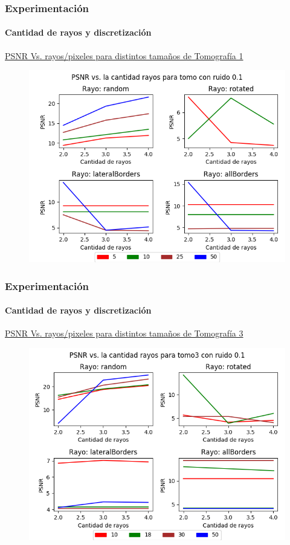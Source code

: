 \documentclass{beamer}
\begin{document}
\begin{frame}
\frametitle{Experimentación}
\framesubtitle{Cantidad de rayos y discretización}
\underline{PSNR Vs. rayos/pixeles para distintos tamaños de Tomografía 1}
\begin{figure}[H]
  \centering
  \includegraphics[height=0.75\textheight]{../graficos/ray_params/tomo/noise_graph_0.png}
\end{figure}
\end{frame}


\begin{frame}
  \frametitle{Experimentación}
  \framesubtitle{Cantidad de rayos y discretización}
  \underline{PSNR Vs. rayos/pixeles para distintos tamaños de Tomografía 3}
  \begin{figure}[H]
    \centering
    \includegraphics[height=0.75\textheight]{../graficos/ray_params/tomo3/noise_graph_0.png}
  \end{figure}
\end{frame}
\end{document}
